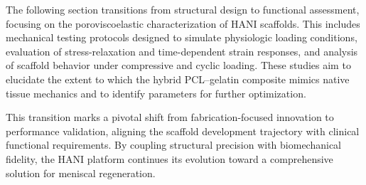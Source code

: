 The following section transitions from structural design to functional assessment, focusing on the poroviscoelastic characterization of HANI scaffolds. This includes mechanical testing protocols designed to simulate physiologic loading conditions, evaluation of stress-relaxation and time-dependent strain responses, and analysis of scaffold behavior under compressive and cyclic loading. These studies aim to elucidate the extent to which the hybrid PCL–gelatin composite mimics native tissue mechanics and to identify parameters for further optimization.

This transition marks a pivotal shift from fabrication-focused innovation to performance validation, aligning the scaffold development trajectory with clinical functional requirements. By coupling structural precision with biomechanical fidelity, the HANI platform continues its evolution toward a comprehensive solution for meniscal regeneration.
